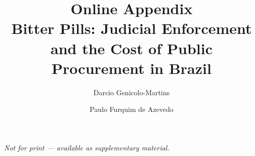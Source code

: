 \documentclass[a4paper,fleqn]{cas-sc}
\begin{document}
\let\WriteBookmarks\relax


\title[mode=title]{Online Appendix\\[4pt]
  \large Bitter Pills: Judicial Enforcement and the Cost of Public Procurement in Brazil}

\author[1]{Darcio Genicolo-Martins}

\author[1]{Paulo Furquim de Azevedo}

\maketitle

\noindent\textit{Not for print --- available as supplementary material.}

\bigskip





\end{document}
